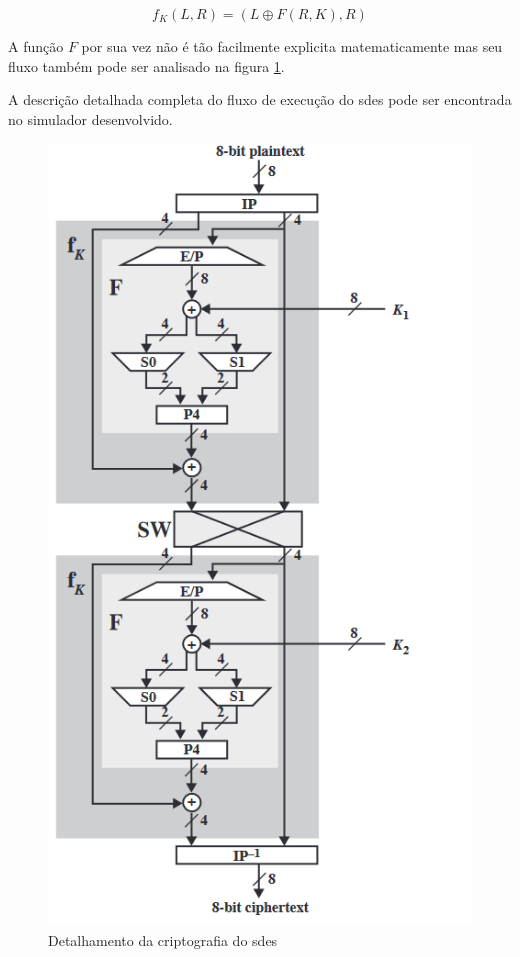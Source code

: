 \[f_K(L, R) = (L \oplus F(R, K), R)\]

A função \(F\) por sua vez não é tão facilmente explicita matematicamente mas seu fluxo também pode ser analisado na figura \ref{fig:sdesdetail}. \cite{stallings10}

A descrição detalhada completa do fluxo de execução do \acrshort{sdes} pode ser encontrada no simulador desenvolvido.

\begin{figure}[H]
    \centering
    \caption{Detalhamento da criptografia do \acrshort{sdes}}
    \label{fig:sdesdetail}
    \includegraphics[width=.5\linewidth]{Figuras/SDESEncrypDetail.png}
\end{figure}
